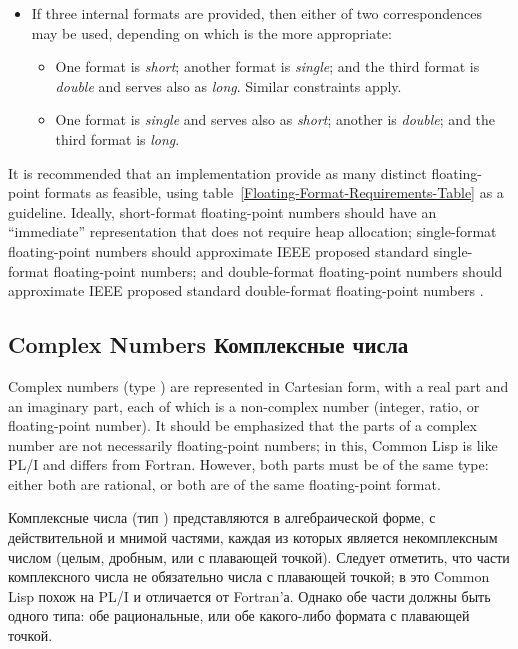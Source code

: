 \begin{itemize}
\item
If three internal formats are provided, then either of two correspondences
may be used, depending on which is the more appropriate:
\begin{itemize}
\item
One format is \emph{short}; another format is \emph{single}; and the third format is
\emph{double} and serves also as \emph{long}.  Similar constraints apply.

\item
One format is \emph{single} and serves also as \emph{short};
another is \emph{double}; and the third format is \emph{long}.
\end{itemize}
\end{itemize}

\beforenoterule
\begin{implementation}
It is recommended that an implementation
provide as many distinct floating-point formats as feasible,
using table~\ref{Floating-Format-Requirements-Table} as a guideline.
Ideally, short-format floating-point numbers should have an
``immediate'' representation that does not require heap allocation;
single-format
floating-point numbers should approximate IEEE proposed standard
single-format floating-point numbers; and double-format floating-point
numbers should approximate IEEE proposed standard double-format
floating-point numbers
\cite{IEEE-PROPOSED-FLOATING-POINT-STANDARD,IEEE-FLOATING-POINT-IMPL-GUIDE,IEEE-FLOATING-POINT-IMPL-GUIDE-ERRATA}.
\end{implementation}
\afternoterule


\subsection{Complex Numbers Комплексные числа}

Complex numbers (type )
are represented in Cartesian form, with a real part and an imaginary
part, each of which is a non-complex number (integer, ratio, or floating-point
number).  It should be emphasized that the parts of a complex
number are not necessarily floating-point numbers; in this, Common Lisp
is like PL/I and differs from Fortran.  However, both parts must
be of the same type: either both are rational, or both are of the
same floating-point format. 

Комплексные числа (тип )
представляются в алгебраической форме, с действительной и мнимой частями, каждая
из которых является некомплексным числом (целым, дробным, или с плавающей
точкой). Следует отметить, что части комплексного числа не
обязательно числа с плавающей точкой; в это Common Lisp похож на PL/I и
отличается от Fortran'а. Однако обе части должны быть одного типа: обе
рациональные, или обе какого-либо формата с плавающей точкой.


